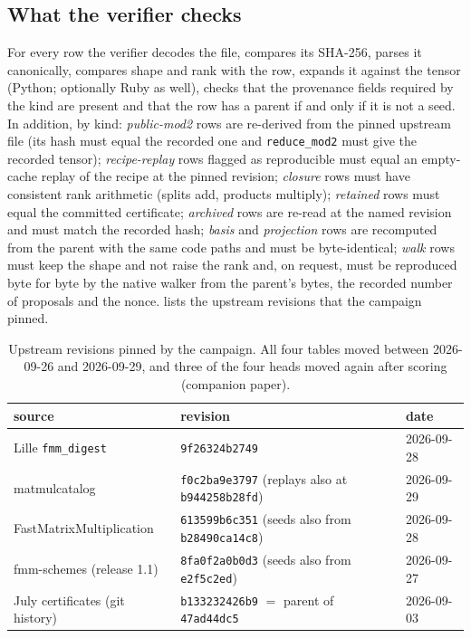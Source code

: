 \subsection{What the verifier checks}
For every row the verifier decodes the file, compares its SHA-256, parses it canonically, compares shape and rank with the row, expands it against the tensor (Python; optionally Ruby as well), checks that the provenance fields required by the kind are present and that the row has a parent if and only if it is not a seed.
In addition, by kind:
\emph{public-mod2} rows are re-derived from the pinned upstream file (its hash must equal the recorded one and \texttt{reduce\_mod2} must give the recorded tensor);
\emph{recipe-replay} rows flagged as reproducible must equal an empty-cache replay of the recipe at the pinned revision;
\emph{closure} rows must have consistent rank arithmetic (splits add, products multiply);
\emph{retained} rows must equal the committed certificate; \emph{archived} rows are re-read at the named revision and must match the recorded hash;
\emph{basis} and \emph{projection} rows are recomputed from the parent with the same code paths and must be byte-identical;
\emph{walk} rows must keep the shape and not raise the rank and, on request, must be reproduced byte for byte by the native walker from the parent's bytes, the recorded number of proposals and the nonce.
 lists the upstream revisions that the campaign pinned.

\begin{table}[t]
\centering\small
\begin{tabular}{@{}lll@{}}
\toprule
source & revision & date\\
\midrule
Lille \texttt{fmm\_digest} & \texttt{9f26324b2749} & 2026-09-28\\
matmulcatalog & \texttt{f0c2ba9e3797} (replays also at \texttt{b944258b28fd}) & 2026-09-29\\
FastMatrixMultiplication & \texttt{613599b6c351} (seeds also from \texttt{b28490ca14c8}) & 2026-09-28\\
fmm-schemes (release 1.1) & \texttt{8fa0f2a0b0d3} (seeds also from \texttt{e2f5c2ed}) & 2026-09-27\\
July certificates (git history) & \texttt{b133232426b9} $=$ parent of \texttt{47ad44dc5} & 2026-09-03\\
\bottomrule
\end{tabular}
\caption{Upstream revisions pinned by the campaign. All four tables moved between 2026-09-26 and 2026-09-29, and three of the four heads moved again after scoring (companion paper).}
\label{tab:revisions}
\end{table}

